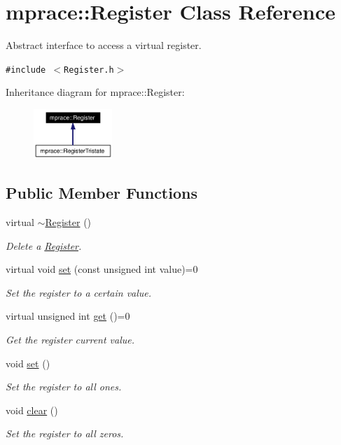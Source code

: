 \hypertarget{classmprace_1_1Register}{
\section{mprace::Register Class Reference}
\label{classmprace_1_1Register}
}
Abstract interface to access a virtual register.  


{\tt \#include $<$Register.h$>$}

Inheritance diagram for mprace::Register:\begin{figure}[H]
\begin{center}
\leavevmode
\includegraphics[width=84pt]{classmprace_1_1Register__inherit__graph}
\end{center}
\end{figure}
\subsection*{Public Member Functions}
\begin{CompactItemize}
\item 
virtual \hyperlink{classmprace_1_1Register_a0}{$\sim$Register} ()
\begin{CompactList}\small\item\em Delete a \hyperlink{classmprace_1_1Register}{Register}. \item\end{CompactList}\item 
virtual void \hyperlink{classmprace_1_1Register_a1}{set} (const unsigned int value)=0
\begin{CompactList}\small\item\em Set the register to a certain value. \item\end{CompactList}\item 
virtual unsigned int \hyperlink{classmprace_1_1Register_a2}{get} ()=0
\begin{CompactList}\small\item\em Get the register current value. \item\end{CompactList}\item 
void \hyperlink{classmprace_1_1Register_a3}{set} ()
\begin{CompactList}\small\item\em Set the register to all ones. \item\end{CompactList}\item 
void \hyperlink{classmprace_1_1Register_a4}{clear} ()
\begin{CompactList}\small\item\em Set the register to all zeros. \item\end{CompactList}\end{CompactItemize}
